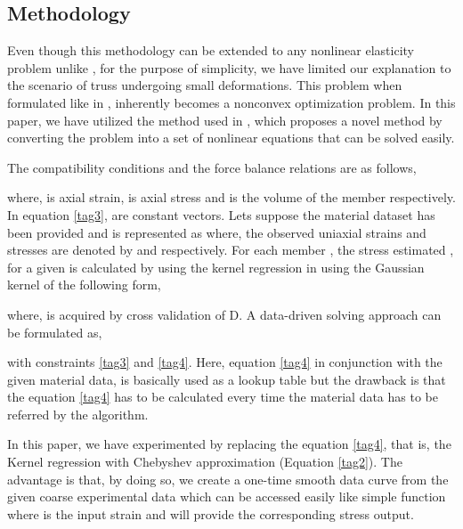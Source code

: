 \documentclass[conference]{IEEEtran}
\begin{document}
\subsection{Methodology}
Even though this methodology can be extended to any nonlinear elasticity problem unlike \cite{24}, for the purpose of simplicity, we have limited our explanation to the scenario of truss undergoing small deformations. This problem when formulated like in \cite{15}, inherently becomes a nonconvex optimization \cite{25} problem. In this paper, we have utilized the method used in \cite{26}, which proposes a novel method by converting the problem into a set of nonlinear equations that can be solved easily.

The compatibility conditions and the force balance relations are as follows,



where,  is axial strain,  is axial stress and  is the volume of the member  respectively. In equation \eqref{tag3},  are constant vectors. Lets suppose the material dataset has been provided and is represented as \smash{\scriptscriptstyle\smile}\smash{\scriptscriptstyle\smile}\smash{\scriptscriptstyle\smile}\smash{\scriptscriptstyle\smile} where, the observed uniaxial strains and stresses are denoted by \smash{\scriptscriptstyle\smile} and \smash{\scriptscriptstyle\smile} respectively. For each member , the stress estimated , for a given  is calculated by using the kernel regression \cite{31} in \cite{26} using the Gaussian kernel of the following form,



where,  is acquired by cross validation of D. A data-driven solving approach can be formulated as,



with constraints \eqref{tag3} and \eqref{tag4}. Here, equation \eqref{tag4} in conjunction with the given material data, is basically used as a lookup table but the drawback is that the equation \eqref{tag4} has to be calculated every time the material data has to be referred by the algorithm. 

In this paper, we have experimented by replacing the equation \eqref{tag4}, that is, the Kernel regression with Chebyshev approximation (Equation \eqref{tag2}). The advantage is that, by doing so, we create a one-time smooth data curve from the given coarse experimental data which can be accessed easily like simple function  where  is the input strain and  will provide the corresponding stress output. 
\end{document}
